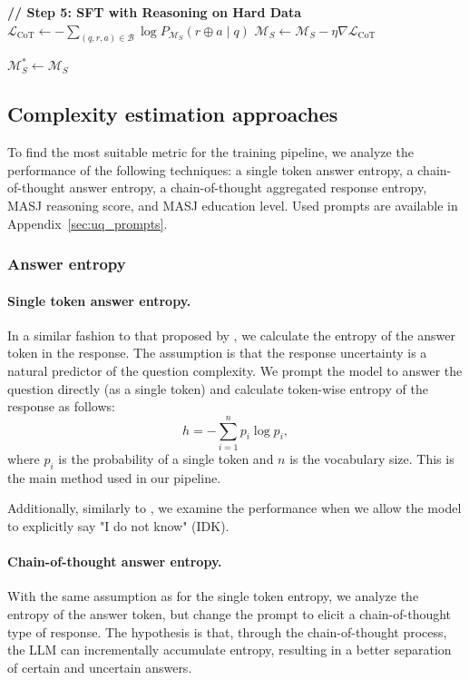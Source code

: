 \begin{algorithm}
\begin{algorithmic}[1]
\Statex
\Statex \textbf{// Step 5: SFT with Reasoning on Hard Data}
        \State $\mathcal{L}_{\text{CoT}} \gets -\sum_{(q,r,a) \in \mathcal{B}} \log P_{\mathcal{M}_S}(r \oplus a \mid q)$
        \State $\mathcal{M}_S \gets \mathcal{M}_S - \eta \nabla \mathcal{L}_{\text{CoT}}$
    \EndFor
\EndFor

\State \Return $\mathcal{M}_S^* \gets \mathcal{M}_S$
\end{algorithmic}
\end{algorithm}

\subsection{Complexity estimation approaches}

To find the most suitable metric for the training pipeline, we analyze the performance of the following techniques:
a single token answer entropy,
a chain-of-thought answer entropy,
a chain-of-thought aggregated response entropy, 
MASJ reasoning score, and
MASJ education level.
Used prompts are available in Appendix~\ref{sec:uq_prompts}.

\subsubsection{Answer entropy}
\label{sec:method_single_token_entropy}

\paragraph{Single token answer entropy.} In a similar fashion to that proposed by \cite{kadavath2022language}, we calculate the entropy of the answer token in the response.  The assumption is that the response uncertainty is a natural predictor of the question complexity. We prompt the model to answer the question directly (as a single token) and calculate token-wise entropy of the response as follows:
$$
h = -\sum_{i = 1}^{n} p_i \log{p_i},
$$
where $p_i$ is the probability of a single token and $n$ is the vocabulary size.
This is the main method used in our pipeline.

Additionally, similarly to \cite{zhou-etal-2023-context}, we examine the performance when we allow the model to explicitly say "I do not know" (IDK).

\paragraph{Chain-of-thought answer entropy.}
With the same assumption as for the single token entropy, we analyze the entropy of the answer token, but change the prompt to elicit a chain-of-thought type of response. The hypothesis is that, through the chain-of-thought process, the LLM can incrementally accumulate entropy, resulting in a better separation of certain and uncertain answers.

